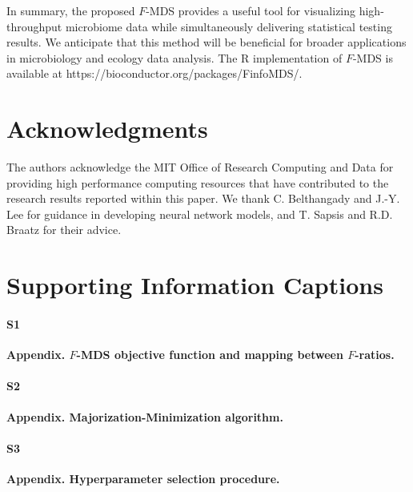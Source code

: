 \documentclass[10pt,letterpaper]{article}
\newcommand{\1}{{\rm 1}\kern-0.24em{\rm I}}
\begin{document}
In summary, the proposed $F$-MDS provides a useful tool for visualizing high-throughput microbiome data while simultaneously delivering statistical testing results. We anticipate that this method will be beneficial for broader applications in microbiology and ecology data analysis. The R implementation of $F$-MDS is available at https://bioconductor.org/packages/FinfoMDS/.



\section*{Acknowledgments}
The authors acknowledge the MIT Office of Research Computing and Data for providing high performance computing resources that have contributed to the research results reported within this paper. We thank C. Belthangady and J.-Y. Lee for guidance in developing neural network models, and T. Sapsis and R.D. Braatz for their advice.


\nolinenumbers




\section*{Supporting Information Captions}

\paragraph*{S1}\hspace{-2ex}
\label{sec:app1}
{\bf Appendix. $F$-MDS objective function and mapping between $F$-ratios.}

\paragraph*{S2}\hspace{-2ex}
\label{sec:app2}
{\bf Appendix. Majorization-Minimization algorithm.}

\paragraph*{S3}\hspace{-2ex}
\label{sec:app3_rev}
{\bf Appendix. Hyperparameter selection procedure.}
\end{document}
